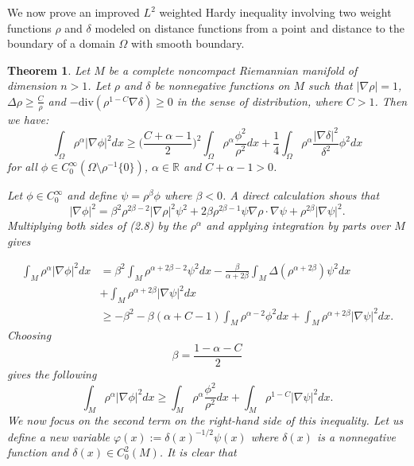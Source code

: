 \documentclass[12pt]{amsart}
\numberwithin{equation}{section}
\newtheorem{theorem}{Theorem}
\numberwithin{theorem}{section}
\numberwithin{theorem}{section} \numberwithin{lemma}{section}
\numberwithin{definition}{section}
\numberwithin{corollary}{section}
\numberwithin{remark}{section}
\numberwithin{proposition}{section}
\begin{document}
We now prove an improved $L^2$ weighted Hardy inequality involving
two weight functions $\rho$ and $\delta$ modeled on distance
functions from a point and distance to the boundary  of a domain
$\Omega$ with smooth boundary.

\begin{theorem} Let $M$ be a complete noncompact Riemannian manifold of dimension $n>1$. Let $\rho$  and $\delta$ be  nonnegative functions on $M$ such
that $|\nabla
 \rho|=1$, $\Delta\rho\ge \frac{C}{\rho}$ and $-\text{div}(\rho^{1-C}\nabla \delta)\ge 0$ in the sense of distribution, where
$C>1$. Then we have:
\begin{equation}\int_{\Omega}\rho^{\alpha}|\nabla\phi|^2dx\ge
\Big(\frac{C+\alpha-1}{2}\Big)^2\int_{\Omega}\rho^{\alpha}\frac{\phi^2}{\rho^2}dx+\frac{1}{4}\int_{\Omega}\rho^{\alpha}\frac{|\nabla
\delta|^2}{\delta^2}\phi^2 dx\end{equation}
 for all $\phi\in C_0^{\infty}(\Omega\setminus
\rho^{-1}\{0\})$, $ \alpha\in \mathbb{R}$ and $C+\alpha-1>0$.

\proof
 Let $\phi\in C_0^{\infty}$ and define $\psi=\rho^{\beta}\phi$  where $\beta<0$. A direct calculation
 shows that
 \begin{equation}
|\nabla\phi|^2=\beta^2\rho^{2\beta-2}|\nabla \rho|^2\psi^2+2\beta
\rho^{2\beta-1}\psi\nabla \rho\cdot
\nabla\psi+\rho^{2\beta}|\nabla\psi|^2.
\end{equation}
Multiplying both sides of (2.8) by the $\rho^{\alpha}$ and applying
integration by parts over $M$ gives

\begin{equation}\begin{aligned}
\int_M \rho^{\alpha}|\nabla\phi|^2dx &=\beta^2\int_M
\rho^{\alpha+2\beta-2}\psi
^2dx-\frac{\beta}{\alpha+2\beta}\int_M
\Delta(\rho^{\alpha+2\beta})\psi^2dx\\&+\int_M \rho^{\alpha+2\beta}|\nabla\psi|^2dx\\
& \ge -\beta^2-\beta(\alpha+C-1)\int_M \rho^{\alpha-2} \phi
^2dx+\int_M \rho^{\alpha+2\beta}|\nabla\psi|^2dx.
\end{aligned}
\end{equation} Choosing
\[\beta=\frac{1-\alpha-C}{2}\]  gives the following
\begin{equation}\int_M \rho^{\alpha}|\nabla\phi|^2dx \ge
\int_M\rho^{\alpha}\frac{\phi^2}{\rho^2}dx+\int_M
\rho^{1-C}|\nabla\psi|^2dx.\end{equation} We now focus on the
second term on the right-hand side of this inequality.  Let us
define a new variable $\varphi (x):=\delta(x)^{-1/2}\psi(x)$ where
$ \delta(x)$ is a nonnegative function and $\delta(x)\in
C_0^2(M)$. It is clear that


\end{theorem}
\end{document}
